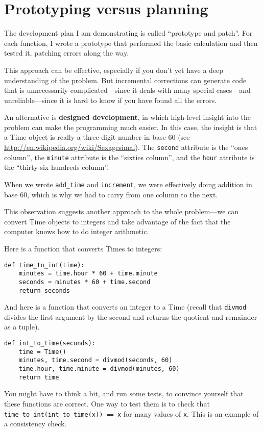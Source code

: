 \documentclass[10pt]{book}
\begin{document}
\section{Prototyping versus planning}
\label{prototype}

The development plan I am demonstrating is called ``prototype and
patch''.  For each function, I wrote a prototype that performed the
basic calculation and then tested it, patching errors along the
way.

This approach can be effective, especially if you don't yet have a
deep understanding of the problem.  But incremental corrections can
generate code that is unnecessarily complicated---since it deals with
many special cases---and unreliable---since it is hard to know if you
have found all the errors.

An alternative is {\bf designed development}, in which high-level
insight into the problem can make the programming much easier.  In
this case, the insight is that a Time object is really a three-digit
number in base 60 (see \url{http://en.wikipedia.org/wiki/Sexagesimal}).  The
{\tt second} attribute is the ``ones column'', the {\tt minute}
attribute is the ``sixties column'', and the {\tt hour} attribute is
the ``thirty-six hundreds column''.

When we wrote \verb"add_time" and {\tt increment}, we were effectively
doing addition in base 60, which is why we had to carry from one
column to the next.

This observation suggests another approach to the whole problem---we
can convert Time objects to integers and take advantage of the fact
that the computer knows how to do integer arithmetic.  

Here is a function that converts Times to integers:

\begin{verbatim}
def time_to_int(time):
    minutes = time.hour * 60 + time.minute
    seconds = minutes * 60 + time.second
    return seconds
\end{verbatim}
%
And here is a function that converts an integer to a Time
(recall that {\tt divmod} divides the first argument by the second
and returns the quotient and remainder as a tuple).

\begin{verbatim}
def int_to_time(seconds):
    time = Time()
    minutes, time.second = divmod(seconds, 60)
    time.hour, time.minute = divmod(minutes, 60)
    return time
\end{verbatim}
%
You might have to think a bit, and run some tests, to convince
yourself that these functions are correct.  One way to test them is to
check that \verb"time_to_int(int_to_time(x)) == x" for many values of
{\tt x}.  This is an example of a consistency check.
\end{document}
